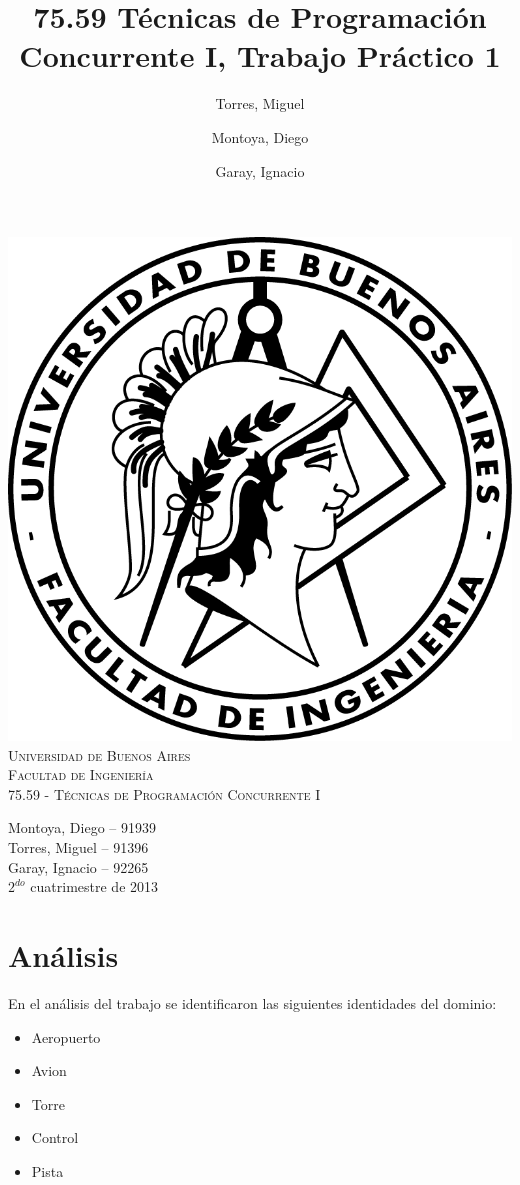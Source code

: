 \documentclass[a4paper,12pt,titlepage]{article}
\title{75.59 Técnicas de Programación Concurrente I, Trabajo Práctico 1}
\author{Torres, Miguel \and Montoya, Diego \and Garay, Ignacio}
\begin{document}
\thispagestyle{empty}
\begin{center}
\includegraphics{./logo-fiuba.png}\\
\vspace{1cm}
\textsc{\LARGE Universidad de Buenos Aires}\\[0.3cm]
\textsc{\LARGE Facultad de Ingenier\'ia}\\[1.2cm]
\textsc{\Large 75.59 - Técnicas de Programación Concurrente I}\\[0.3cm]
\end{center}

\begin{flushright}
{\large
Montoya, Diego -- 91939\\
Torres, Miguel -- 91396\\
Garay, Ignacio -- 92265\\
\vspace{2cm}
$2^{do}$ cuatrimestre de 2013}
\end{flushright}

\pagestyle{fancy}
\setcounter{page}{1}
\newpage

\tableofcontents
\newpage

\footnotesize
\section{Análisis}
En el análisis del trabajo se identificaron las siguientes identidades del dominio:\\
\begin{itemize}
\item Aeropuerto
\item Avion
\item Torre
\item Control
\item Pista
\end{itemize}
\end{document}

